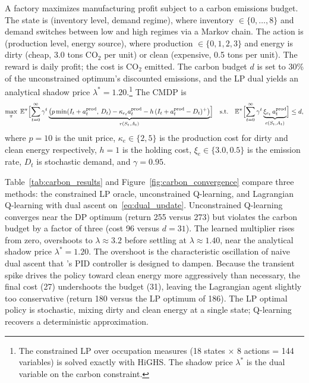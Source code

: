 A factory maximizes manufacturing profit subject to a carbon
emissions budget. The state is (inventory level, demand regime),
where inventory $\in \{0,\ldots,8\}$ and demand switches between
low and high regimes via a Markov chain. The action is
(production level, energy source), where production $\in \{0,1,2,3\}$
and energy is dirty (cheap, 3.0 tons CO$_2$ per unit) or clean
(expensive, 0.5 tons per unit). The reward is daily profit; the
cost is CO$_2$ emitted. The carbon budget $d$ is set to 30\% of the
unconstrained optimum's discounted emissions, and the LP dual
yields an analytical shadow price $\lambda^* = 1.20$.\footnote{The
constrained LP over occupation measures (18 states $\times$ 8
actions = 144 variables) is solved exactly with HiGHS. The shadow
price $\lambda^*$ is the dual variable on the carbon constraint.}
The CMDP is
\begin{equation}
  \max_\pi \; \mathbb{E}^\pi\Bigl[\sum_{t=0}^\infty \gamma^t
    \underbrace{\bigl(p \min(I_t + a^{\mathrm{prod}}_t,\, D_t)
    - \kappa_{e_t} a^{\mathrm{prod}}_t
    - h\,(I_t + a^{\mathrm{prod}}_t - D_t)^+\bigr)}_{r(S_t, A_t)}\Bigr]
  \quad \text{s.t.} \quad
  \mathbb{E}^\pi\Bigl[\sum_{t=0}^\infty \gamma^t
    \underbrace{\xi_{e_t}\, a^{\mathrm{prod}}_t}_{c(S_t, A_t)}\Bigr]
  \leq d,
  \label{eq:carbon_cmdp}
\end{equation}
where $p = 10$ is the unit price, $\kappa_e \in \{2, 5\}$ is the
production cost for dirty and clean energy respectively,
$h = 1$ is the holding cost, $\xi_e \in \{3.0, 0.5\}$ is the
emission rate, $D_t$ is stochastic demand, and $\gamma = 0.95$.

Table~\ref{tab:carbon_results} and
Figure~\ref{fig:carbon_convergence} compare three methods:
the constrained LP oracle, unconstrained Q-learning, and
Lagrangian Q-learning with dual ascent
on~\eqref{eq:dual_update}. Unconstrained Q-learning converges
near the DP optimum (return 255 versus 273) but violates the
carbon budget by a factor of three (cost 96 versus $d = 31$).
The learned multiplier rises from zero, overshoots to
$\lambda \approx 3.2$ before settling at $\lambda \approx 1.40$,
near the analytical shadow price $\lambda^* = 1.20$.
The overshoot is the characteristic oscillation of naive dual
ascent that \citet{Stooke2020}'s PID controller is designed
to dampen. Because the transient spike drives the policy
toward clean energy more aggressively than necessary, the
final cost (27) undershoots the budget (31), leaving the
Lagrangian agent slightly too conservative (return 180 versus
the LP optimum of 186). The LP optimal policy is stochastic,
mixing dirty and clean energy at a single state; Q-learning
recovers a deterministic approximation.

